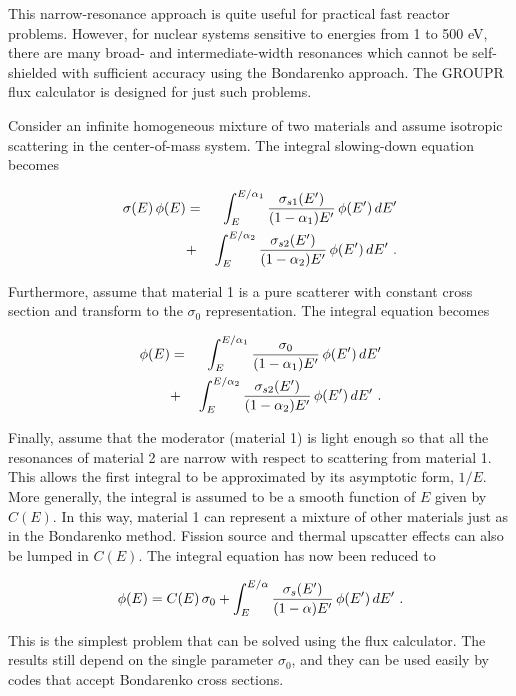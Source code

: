 This narrow-resonance approach is quite useful for practical fast
reactor problems.  However, for nuclear systems sensitive to energies
from 1 to 500 eV, there are many broad- and intermediate-width resonances
which cannot be self-shielded with sufficient accuracy using the
Bondarenko approach.  The GROUPR flux calculator
is designed for just such problems.

Consider an infinite homogeneous mixture of two materials and assume
isotropic scattering in the center-of-mass system.  The integral
slowing-down equation becomes

  \begin{eqnarray}
    \sigma(E)\,\phi(E)&=&\int_E^{E/\alpha_1}{{\sigma_{s1}(E')}\over
    {(1-\alpha_1)E'}}\,\phi(E')\,dE'\nonumber\\
    &+&\int_E^{E/\alpha_2}{{\sigma_{s2}(E')}\over
    {(1-\alpha_2)E'}}\,\phi(E')\,dE'\,\,.
  \end{eqnarray}

\noindent
Furthermore, assume that material 1 is a pure scatterer with constant
cross section and transform to the $\sigma_0$ representation.  The
integral equation becomes

  \begin{eqnarray}
    [\sigma_0+\sigma_{t2}(E)]\,\phi(E)&=&
    \int_E^{E/\alpha_1}{{\sigma_0}\over
    {(1-\alpha_1)E'}}\,\phi(E')\,dE'\nonumber\\
    &+&\int_E^{E/\alpha_2}{{\sigma_{s2}(E')}\over
    {(1-\alpha_2)E'}}\,\phi(E')\,dE'\,\,.
  \end{eqnarray}

\noindent
Finally, assume that the moderator (material 1) is light enough so that
all the resonances of material 2 are narrow with respect to scattering
from material 1.  This allows the first integral to be approximated by
its asymptotic form, $1/E$.  More generally, the integral is assumed to
be a smooth function of $E$ given by $C(E)$.  In this way, material 1
can represent a mixture of other materials just as in the Bondarenko
method.  Fission source and thermal upscatter effects can also be lumped
in $C(E)$.  The integral equation has now been reduced to

  \begin{equation}
    [\sigma_0+\sigma_t(E)]\,\phi(E)={C(E)\,\sigma_0}
    +\int_E^{E/\alpha}{{\sigma_s(E')}\over
    {(1-\alpha)E'}}\,\phi(E')\,dE'\,\,.
  \label{Eq33}
  \end{equation}

\noindent
This is the simplest problem that can be solved using the flux calculator.
The results still depend on the single parameter $\sigma_0$, and they
can be used easily by codes that accept Bondarenko cross sections.


